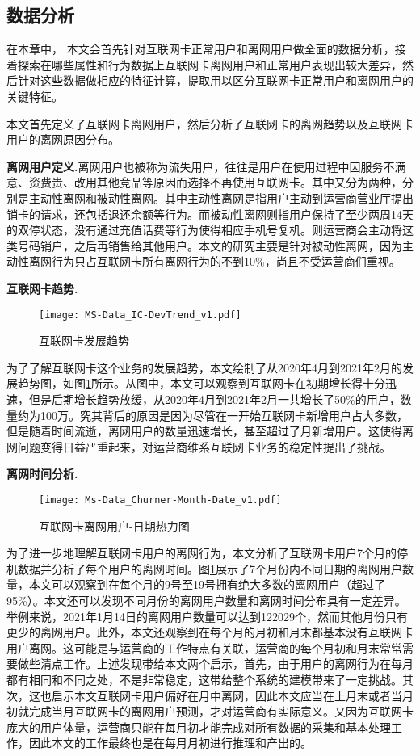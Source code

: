\subsection{数据分析}
在本章中， 本文会首先针对互联网卡正常用户和离网用户做全面的数据分析，接着探索在哪些属性和行为数据上互联网卡离网用户和正常用户表现出较大差异，然后针对这些数据做相应的特征计算，提取用以区分互联网卡正常用户和离网用户的关键特征。\par
本文首先定义了互联网卡离网用户，然后分析了互联网卡的离网趋势以及互联网卡用户的离网原因分布。\par
\textbf{离网用户定义.}离网用户也被称为流失用户，往往是用户在使用过程中因服务不满意、资费贵、改用其他竞品等原因而选择不再使用互联网卡。其中又分为两种，分别是主动性离网和被动性离网。其中主动性离网是指用户主动到运营商营业厅提出销卡的请求，还包括退还余额等行为。而被动性离网则指用户保持了至少两周14天的双停状态，没有通过充值话费等行为使得相应手机号复机。则运营商会主动将这类号码销户，之后再销售给其他用户。本文的研究主要是针对被动性离网，因为主动性离网行为只占互联网卡所有离网行为的不到10\%，尚且不受运营商们重视。
\par
\textbf{互联网卡趋势.}
\begin{figure}[hbt]
	\centering
	\texttt{[image: MS-Data\_IC-DevTrend\_v1.pdf]}
	\caption{互联网卡发展趋势}
	\label{Fig:IC-DevTrend}
\end{figure}
为了了解互联网卡这个业务的发展趋势，本文绘制了从2020年4月到2021年2月的发展趋势图，如图\ref{Fig:IC-DevTrend}所示。从图中，本文可以观察到互联网卡在初期增长得十分迅速，但是后期增长趋势放缓，从2020年4月到2021年2月一共增长了50\%的用户，数量约为100万。究其背后的原因是因为尽管在一开始互联网卡新增用户占大多数，但是随着时间流逝，离网用户的数量迅速增长，甚至超过了月新增用户。这使得离网问题变得日益严重起来，对运营商维系互联网卡业务的稳定性提出了挑战。
\par
\textbf{离网时间分析.}
\begin{figure}[hbt]
	\centering
	\texttt{[image: Ms-Data\_Churner-Month-Date\_v1.pdf]}
	\caption{互联网卡离网用户-日期热力图}
	\label{Fig:Churner-Month-Date}
\end{figure}
为了进一步地理解互联网卡用户的离网行为，本文分析了互联网卡用户7个月的停机数据并分析了每个用户的离网时间。图\ref{Fig:IC-DevTrend}展示了7个月份内不同日期的离网用户数量，本文可以观察到在每个月的9号至19号拥有绝大多数的离网用户（超过了95\%）。本文还可以发现不同月份的离网用户数量和离网时间分布具有一定差异。举例来说，2021年1月14日的离网用户数量可以达到122029个，然而其他月份只有更少的离网用户。此外，本文还观察到在每个月的月初和月末都基本没有互联网卡用户离网。这可能是与运营商的工作特点有关联，运营商的每个月初和月末常常需要做些清点工作。上述发现带给本文两个启示，首先，由于用户的离网行为在每月都有相同和不同之处，不是非常稳定，这带给整个系统的建模带来了一定挑战。其次，这也启示本文互联网卡用户偏好在月中离网，因此本文应当在上月末或者当月初就完成当月互联网卡的离网用户预测，才对运营商有实际意义。又因为互联网卡庞大的用户体量，运营商只能在每月初才能完成对所有数据的采集和基本处理工作，因此本文的工作最终也是在每月月初进行推理和产出的。


